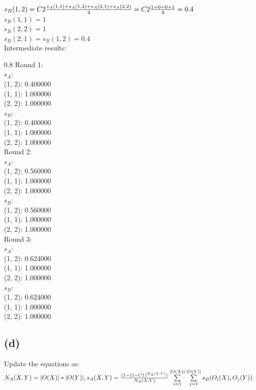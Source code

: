 \documentclass{article}
\newenvironment{myenv}[1]
  {\begin{spacing}{#1}}
  {\end{spacing}}
\begin{document}
$s_B(1, 2) =  \\ C2\frac{s_A(1, 1) + s_A(1, 2) + s_A(2, 1) + s_A(2, 2)}{4} =\\ C2\frac{1 + 0 + 0 + 1}{4} = 0.4$ \\
$s_B(1, 1) =  1$ \\
$s_B(2, 2) =  1$ \\
$s_B(2, 1) =  s_B(1, 2) = 0.4$ \\

Intermediate results: \\

\begin{myenv}{0.8}
Round 1:\\ 
$s_A$:\\
(1, 2): 0.400000 \\
(1, 1): 1.000000 \\
(2, 2): 1.000000 \\
$s_B$:\\
(1, 2): 0.400000 \\
(1, 1): 1.000000 \\
(2, 2): 1.000000 \\
Round 2:\\ 
$s_A$:\\
(1, 2): 0.560000 \\
(1, 1): 1.000000 \\
(2, 2): 1.000000 \\
$s_B$:\\
(1, 2): 0.560000 \\
(1, 1): 1.000000 \\
(2, 2): 1.000000 \\
Round 3:\\ 
$s_A$:\\
(1, 2): 0.624000 \\
(1, 1): 1.000000 \\
(2, 2): 1.000000 \\
$s_B$:\\
(1, 2): 0.624000 \\
(1, 1): 1.000000 \\
(2, 2): 1.000000 \\
\end{myenv}

\subsection{(d)}
Update the equations as:\\
$N_A(X, Y) = |O(X)| * |O(Y)|, \\
s_A(X, Y) = \frac{ (1-(1-C1)^{N_A(X, Y)})}
 {N_A(X, Y)} \sum\limits_{i=1}^{|O(X)|} \sum\limits_{j=1}^{|O(Y)|} 
    s_B(O_i(X), O_j(Y))$ \\
\end{document}
